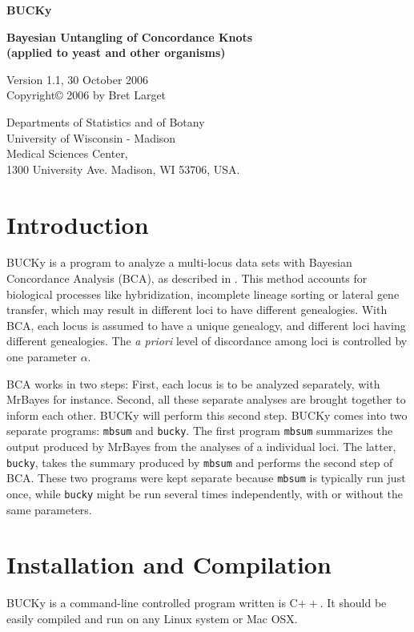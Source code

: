\documentclass[12pt,english,final,letterpaper]{article}
\newcommand{\bu}{BUCKy}
\begin{document}
\begin{center}
{\Large\bf BUCKy}

{\bf Bayesian Untangling of Concordance Knots\\
(applied to yeast and other organisms)}
\bigskip

Version 1.1, 30 October 2006\\
Copyright\copyright{} 2006 by Bret Larget
\medskip

{\small
Departments of Statistics and of Botany\\ 
University of Wisconsin - Madison\\ 
Medical Sciences Center,\\ 
1300 University Ave. Madison, WI 53706, USA.
}
\end{center}


\section{Introduction}
\bu{} is a program to analyze a multi-locus data sets with 
Bayesian Concordance Analysis (BCA), as described in \cite{ane-etal-2006}.
This method accounts for biological processes like hybridization, 
incomplete lineage sorting or lateral gene transfer, which may result
in different loci to have different genealogies. With BCA,
each locus is assumed to have a unique genealogy, and different
loci having different genealogies. The {\it a priori} level of 
discordance among loci is controlled by one parameter $\alpha$.

BCA works in two steps: First, each locus is to be analyzed 
separately, with MrBayes for instance. Second, all these separate
analyses are brought together to inform each other. \bu{} will
perform this second step.
\bu{} comes into two separate programs: {\tt mbsum} and {\tt bucky}.
The first program {\tt mbsum} summarizes the output produced by MrBayes
from the analyses of a individual loci. The latter, {\tt bucky}, 
takes the summary produced by {\tt mbsum} and performs the second step
of BCA. These two programs were kept separate because {\tt mbsum}
is typically run just once, while {\tt bucky} might be run several
times  independently, with or without the same parameters.

\section{Installation and Compilation}
\bu{} is a command-line controlled program written is C$++$.
It should be easily compiled and run on any Linux system or Mac OSX. 
\end{document}
